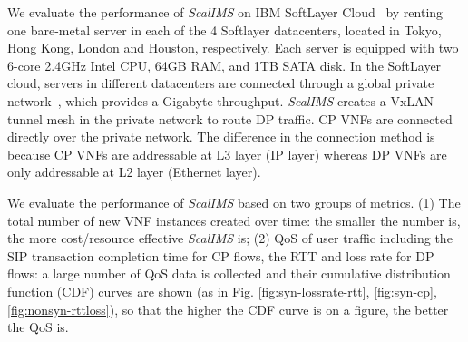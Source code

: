 We evaluate the performance of \textit{ScalIMS} on IBM SoftLayer Cloud~\cite{softlayer} by renting one bare-metal server in each of the 4 Softlayer datacenters, located in Tokyo, Hong Kong, London and Houston, respectively. Each server is equipped with two 6-core 2.4GHz Intel CPU, 64GB RAM, and 1TB SATA disk. In the SoftLayer cloud, servers in different datacenters are connected through a global private network~\cite{softlayer}, which provides a Gigabyte throughput. \textit{ScalIMS} creates a VxLAN tunnel mesh in the private network to route DP traffic. CP VNFs are connected directly over the private network. The difference in the connection method is because CP VNFs are addressable at L3 layer (IP layer) whereas DP VNFs are only addressable at L2 layer (Ethernet layer).



 We evaluate the performance of \textit{ScalIMS} based on two groups of metrics. (1) The total number of new VNF instances created over time: the smaller the number is, the more cost/resource effective \textit{ScalIMS} is; (2) QoS of user traffic including the SIP transaction completion time for CP flows, the RTT and loss rate for DP flows: a large number of QoS data is collected and their cumulative distribution function (CDF) curves are shown (as in Fig. \ref{fig:syn-lossrate-rtt}, \ref{fig:syn-cp}, \ref{fig:nonsyn-rttloss}), so that the higher the CDF curve is on a figure, the better the QoS is. %




